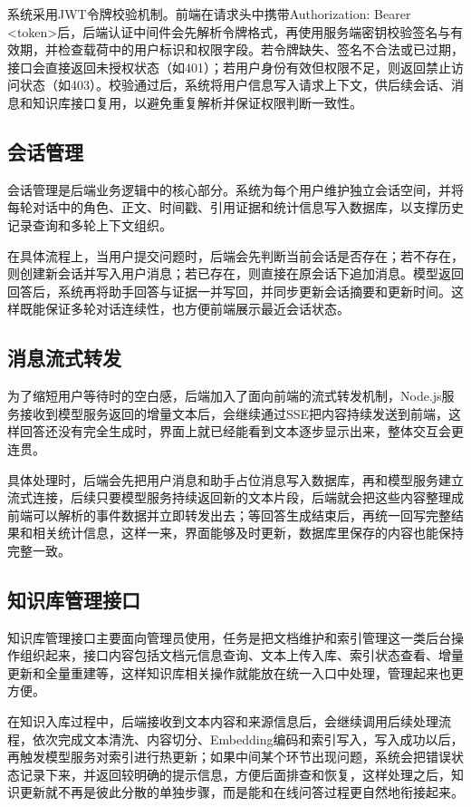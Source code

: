 系统采用JWT令牌校验机制。前端在请求头中携带Authorization: Bearer <token>后，后端认证中间件会先解析令牌格式，再使用服务端密钥校验签名与有效期，并检查载荷中的用户标识和权限字段。若令牌缺失、签名不合法或已过期，接口会直接返回未授权状态（如401）；若用户身份有效但权限不足，则返回禁止访问状态（如403）。校验通过后，系统将用户信息写入请求上下文，供后续会话、消息和知识库接口复用，以避免重复解析并保证权限判断一致性。

\subsection{会话管理}

会话管理是后端业务逻辑中的核心部分。系统为每个用户维护独立会话空间，并将每轮对话中的角色、正文、时间戳、引用证据和统计信息写入数据库，以支撑历史记录查询和多轮上下文组织。

在具体流程上，当用户提交问题时，后端会先判断当前会话是否存在；若不存在，则创建新会话并写入用户消息；若已存在，则直接在原会话下追加消息。模型返回回答后，系统再将助手回答与证据一并写回，并同步更新会话摘要和更新时间。这样既能保证多轮对话连续性，也方便前端展示最近会话状态。

\subsection{消息流式转发}

为了缩短用户等待时的空白感，后端加入了面向前端的流式转发机制，Node.js服务接收到模型服务返回的增量文本后，会继续通过SSE把内容持续发送到前端，这样回答还没有完全生成时，界面上就已经能看到文本逐步显示出来，整体交互会更连贯。

具体处理时，后端会先把用户消息和助手占位消息写入数据库，再和模型服务建立流式连接，后续只要模型服务持续返回新的文本片段，后端就会把这些内容整理成前端可以解析的事件数据并立即转发出去；等回答生成结束后，再统一回写完整结果和相关统计信息，这样一来，界面能够及时更新，数据库里保存的内容也能保持完整一致。

\subsection{知识库管理接口}

知识库管理接口主要面向管理员使用，任务是把文档维护和索引管理这一类后台操作组织起来，接口内容包括文档元信息查询、文本上传入库、索引状态查看、增量更新和全量重建等，这样知识库相关操作就能放在统一入口中处理，管理起来也更方便。

在知识入库过程中，后端接收到文本内容和来源信息后，会继续调用后续处理流程，依次完成文本清洗、内容切分、Embedding编码和索引写入，写入成功以后，再触发模型服务对索引进行热更新；如果中间某个环节出现问题，系统会把错误状态记录下来，并返回较明确的提示信息，方便后面排查和恢复，这样处理之后，知识更新就不再是彼此分散的单独步骤，而是能和在线问答过程更自然地衔接起来。

